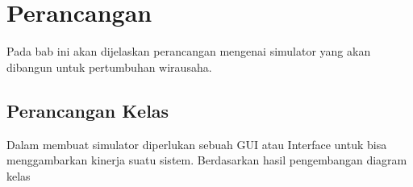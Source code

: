 \chapter{Perancangan}
\label{chap:analisis}

Pada bab ini akan dijelaskan perancangan mengenai simulator yang akan dibangun untuk pertumbuhan wirausaha.

\section{Perancangan Kelas}
\label{sec:perancangankelas}

Dalam membuat simulator diperlukan sebuah GUI atau Interface untuk bisa menggambarkan kinerja suatu sistem. Berdasarkan hasil pengembangan diagram kelas